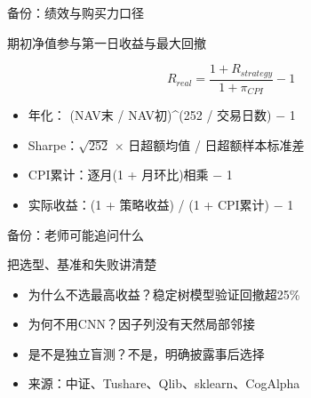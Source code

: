 \documentclass[aspectratio=169,10pt]{beamer}
\begin{document}
\begin{frame}{备份：绩效与购买力口径}
\begin{block}{}期初净值参与第一日收益与最大回撤\end{block}
\[R_{real}=\frac{1+R_{strategy}}{1+\pi_{CPI}}-1\]
\small\begin{itemize}
\item 年化： (NAV末 / NAV初)\textasciicircum{}(252 / 交易日数) $-$ 1
\item Sharpe：$\sqrt{252}$ $\times$ 日超额均值 / 日超额样本标准差
\item CPI累计：逐月(1 + 月环比)相乘 $-$ 1
\item 实际收益：(1 + 策略收益) / (1 + CPI累计) $-$ 1
\end{itemize}
\end{frame}

\begin{frame}{备份：老师可能追问什么}
\begin{block}{}把选型、基准和失败讲清楚\end{block}
\small\begin{itemize}
\item 为什么不选最高收益？稳定树模型验证回撤超25\%
\item 为何不用CNN？因子列没有天然局部邻接
\item 是不是独立盲测？不是，明确披露事后选择
\item 来源：中证、Tushare、Qlib、sklearn、CogAlpha
\end{itemize}
\end{frame}
\end{document}
